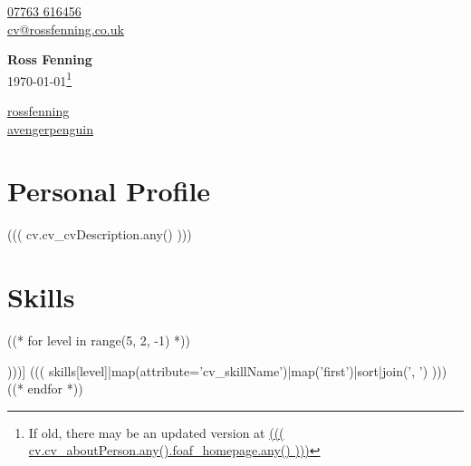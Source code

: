 \documentclass[10pt]{article}
\begin{document}
\begin{multicols}{3}
  \begin{flushleft}
    {\color{icnclr}} \href{tel:+447763616456}{07763 616456} \\
    {\color{icnclr}\faEnvelope[regular]} \href{mailto:cv@rossfenning.co.uk}{cv@rossfenning.co.uk} \\
  \end{flushleft}

\columnbreak

  \begin{center}
      {\huge\bfseries Ross Fenning} \\
      \today\footnote{If old, there may be an updated version at \href{((( cv.cv_aboutPerson.any().foaf_homepage.any() )))}{((( cv.cv_aboutPerson.any().foaf_homepage.any() )))}}
 \end{center}

\columnbreak

  \begin{flushright}
    \href{https://www.linkedin.com/in/rossfenning/}{rossfenning} {\color{icnclr}\faLinkedinIn} \\
    \href{https://github.com/avengerpenguin}{avengerpenguin} {\color{icnclr}\faGithub} \\
  \end{flushright}
\end{multicols}



\section*{Personal Profile}
((( cv.cv_cvDescription.any() )))

\section*{Skills}

\begin{description}
((* for level in range(5, 2, -1) *))
\item[((( skill_levels[level] )))] ((( skills[level]|map(attribute='cv_skillName')|map('first')|sort|join(', ') )))
((* endfor *))
\end{description}
\end{document}
